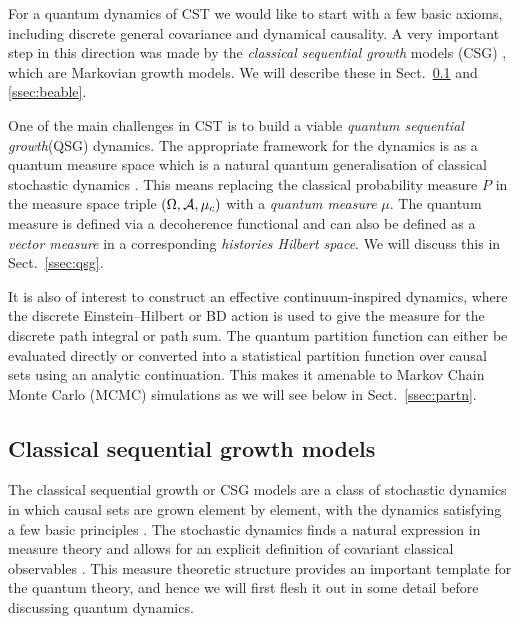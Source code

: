 For a  quantum dynamics of CST  we would like to start  
with a few  basic axioms, including discrete general covariance and dynamical causality. A very important step in this
direction was made by the \emph{classical sequential growth}  models (CSG)\citep{csg} , which are Markovian
growth models. We will describe these in Sect.~\ref{ssec:csg} and \ref{ssec:beable}. 

One of the main challenges in CST is to build a viable \emph{quantum sequential growth}(QSG) dynamics. The  appropriate
framework for the dynamics is as a quantum measure space which  is a natural quantum
generalisation of classical stochastic dynamics \citep{qmeasureone,qmeasuretwo,sorkinqmeasure}. This means replacing the
classical probability measure $P$ in the
measure space triple $(\Omega, \mathcal A, \mu_c)$ with a \emph{quantum measure} $\mu$.  The quantum measure is defined via a
decoherence functional  and can also be defined as a \emph{vector measure}  in a  corresponding \emph{histories Hilbert
  space}. We will discuss this in Sect.~\ref{ssec:qsg}. 

It is also of interest to construct  an effective   continuum-inspired dynamics, where the discrete
Einstein--Hilbert or BD action is used to give the measure for the discrete path integral or path sum. The quantum
partition function can either be evaluated directly or converted into a statistical partition function over causal sets using an analytic
continuation. This makes it amenable to  Markov Chain Monte Carlo (MCMC) simulations as we  will see below in Sect.~\ref{ssec:partn}. 



\subsection{Classical sequential growth models}
\label{ssec:csg}

The \cite{csg} classical sequential growth or CSG models are a class of stochastic dynamics in which causal sets are grown
element by element, with the dynamics satisfying a few basic principles \citep{csg,csgtwo,csgrg,davidthesis,rv}. The
stochastic dynamics  finds a natural expression in measure theory and allows for an explicit definition of 
covariant classical observables \citep{observables,observablesds}. This measure theoretic
structure provides an important template for the quantum theory, and hence we will first flesh it out in some detail
before discussing quantum dynamics.      

